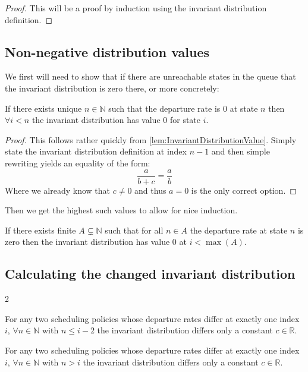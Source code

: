 \begin{proof}
  This will be a proof by induction using the invariant distribution definition.
\end{proof}

\subsection{Non-negative distribution values}
We first will need to show that if there are unreachable states in the queue that the invariant
distribution is zero there, or more concretely:
\begin{lemma}\label{lem:UnreachableInvariantDistribution}
  If there exists unique $n \in \mathbb{N}$ such that the departure rate is $0$ at state $n$ then $\forall
  i < n$ the invariant distribution has value $0$ for state $i$.
\end{lemma}

\begin{proof}
  This follows rather quickly from \ref{lem:InvariantDistributionValue}. Simply state the invariant distribution
  definition at index $n-1$ and then simple rewriting yields an equality of the form:
  $$\frac{a}{b+c} = \frac{a}{b}$$
  Where we already know that $c\neq0$ and thus $a=0$ is the only correct option.
\end{proof}

Then we get the highest such values to allow for nice induction.
\begin{lemma}\label{lem:MaxUnreachableInvariance}
  If there exists finite $A \subsetneq \mathbb{N}$ such that for all $n \in A$ the departure rate at
  state $n$ is zero then the invariant distribution has value $0$ at $i < \max(A)$.
\end{lemma}



\subsection{Calculating the changed invariant distribution}2
\begin{lemma}\label{lem:BeforeCutScaled}
  For any two scheduling policies whose departure rates differ at exactly one index $i$, $\forall n \in \mathbb{N}$
  with $n \leq i - 2$ the invariant distribution differs only a constant $c \in \mathbb{R}$.
\end{lemma}

\begin{lemma}\label{lem:AfterCutScaled}
  For any two scheduling policies whose departure rates differ at exactly one index $i$, $\forall n \in \mathbb{N}$
  with $n > i $ the invariant distribution differs only a constant $c \in \mathbb{R}$.
\end{lemma}
